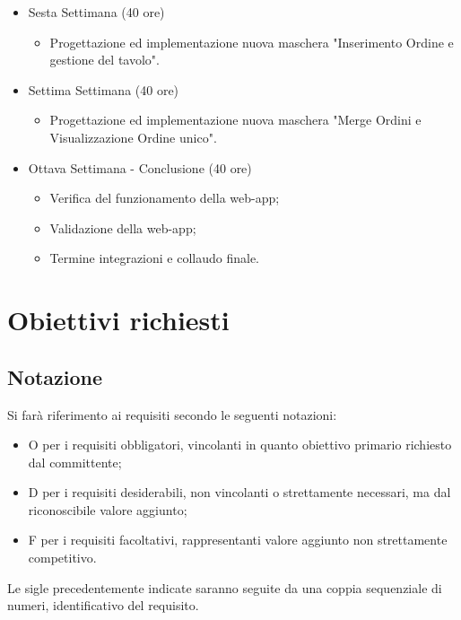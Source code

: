 \begin{itemize}
\begin{itemize}
        \end{itemize}
    \item Sesta Settimana (40 ore)
    \begin{itemize}
        \item Progettazione ed implementazione nuova maschera "Inserimento Ordine e gestione del tavolo".
    \end{itemize}
    \item Settima Settimana (40 ore)
    \begin{itemize}
        \item Progettazione ed implementazione nuova maschera "Merge Ordini e Visualizzazione Ordine unico".
    \end{itemize}
    \item Ottava Settimana - Conclusione (40 ore)
    \begin{itemize}
        \item Verifica del funzionamento della web-app;
        \item Validazione della web-app;
        \item Termine integrazioni e collaudo finale.
    \end{itemize}
\end{itemize}

\section{Obiettivi richiesti}
\subsection{Notazione}
Si farà riferimento ai requisiti secondo le seguenti notazioni:
\begin{itemize}
    \item O per i requisiti obbligatori, vincolanti in quanto obiettivo primario richiesto dal committente;
    \item D per i requisiti desiderabili, non vincolanti o strettamente necessari, ma dal riconoscibile valore
    aggiunto;
    \item F per i requisiti facoltativi, rappresentanti valore aggiunto non strettamente competitivo.
\end{itemize}
Le sigle precedentemente indicate saranno seguite da una coppia sequenziale di numeri, identificativo del
requisito.
